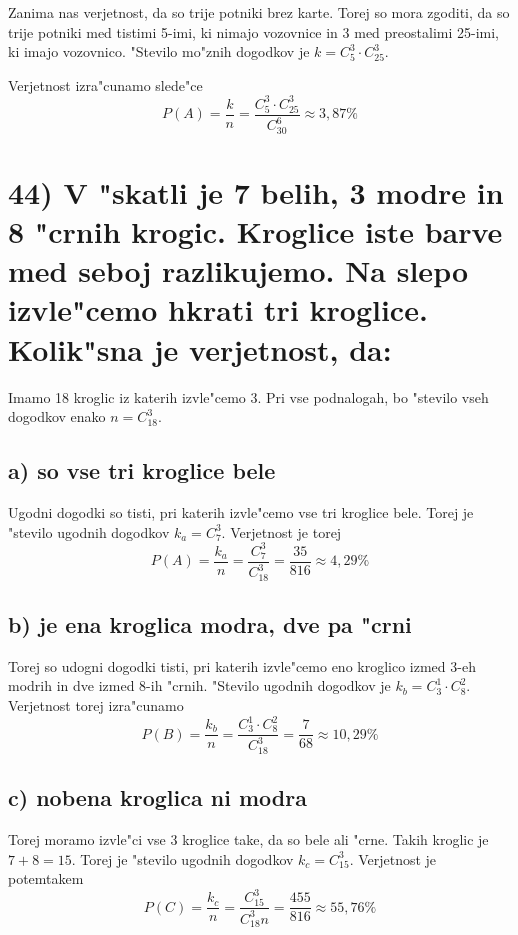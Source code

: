 \documentclass[a4paper, 12pt]{article}
\begin{document}
Zanima nas verjetnost, da so trije potniki brez karte. Torej so mora zgoditi, da so trije potniki med tistimi 5-imi, ki nimajo vozovnice in 3 med preostalimi 25-imi, ki imajo vozovnico. "Stevilo mo"znih dogodkov je $k = C_5^3 \cdot C_{25}^3$.

Verjetnost izra"cunamo slede"ce
\begin{equation*}
P(A) = \dfrac{k}{n} = \dfrac{C_5^3 \cdot C_{25}^3}{C_{30}^6} \approx 3,87\%
\end{equation*}

\section*{44) V "skatli je 7 belih, 3 modre in 8 "crnih krogic. Kroglice iste barve med seboj razlikujemo. Na slepo izvle"cemo hkrati tri kroglice. Kolik"sna je verjetnost, da:}
Imamo 18 kroglic iz katerih izvle"cemo 3. Pri vse podnalogah, bo "stevilo vseh dogodkov enako $n = C_{18}^3$.
\subsection*{a) so vse tri kroglice bele}
Ugodni dogodki so tisti, pri katerih izvle"cemo vse tri kroglice bele. Torej je "stevilo ugodnih dogodkov $k_a = C_7^3$. Verjetnost je torej
\begin{equation*}
P(A) = \dfrac{k_a}{n} = \dfrac{C_7^3}{C_{18}^3} = \dfrac{35}{816} \approx 4,29\%
\end{equation*}

\subsection*{b) je ena kroglica modra, dve pa "crni}
Torej so udogni dogodki tisti, pri katerih izvle"cemo eno kroglico izmed 3-eh modrih in dve izmed 8-ih "crnih. "Stevilo ugodnih dogodkov je $k_b = C_3^1 \cdot C_8^2$. Verjetnost torej izra"cunamo
\begin{equation*}
P(B) = \dfrac{k_b}{n} = \dfrac{C_3^1 \cdot C_8^2}{C_{18}^3} = \dfrac{7}{68} \approx 10,29\%
\end{equation*}

\subsection*{c) nobena kroglica ni modra}
Torej moramo izvle"ci vse 3 kroglice take, da so bele ali "crne. Takih kroglic je $7 + 8 = 15$. Torej je "stevilo ugodnih dogodkov $k_c = C_{15}^3$. Verjetnost je potemtakem
\begin{equation*}
P(C) = \dfrac{k_c}{n} = \dfrac{C_{15}^3}{C_{18}^3n} = \dfrac{455}{816} \approx 55,76\%
\end{equation*}
\end{document}

